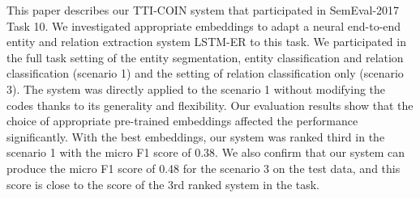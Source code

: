 This paper describes our TTI-COIN system that participated in SemEval-2017 Task 10. We investigated appropriate embeddings to adapt a neural end-to-end entity and relation extraction system LSTM-ER to this task. We participated in the full task setting of the entity segmentation, entity classification and relation classification (scenario 1) and the setting of relation classification only (scenario 3). The system was directly applied to the scenario 1 without modifying the codes thanks to its generality and flexibility. Our evaluation results show that the choice of appropriate pre-trained embeddings affected the performance significantly. With the best embeddings, our system was ranked third in the scenario 1 with the micro F1 score of 0.38. We also confirm that our system can produce the micro F1 score of 0.48 for the scenario 3 on the test data, and this score is close to the score of the 3rd ranked system in the task.
